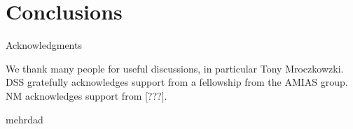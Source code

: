 \documentclass{emulateapj}
\begin{document}


\subsection{}

\section{Conclusions}
\label{sec:conc}

\vspace{0.5in}


{\sc Acknowledgments}

We thank many people for useful discussions, in particular Tony
Mroczkowzki.  DSS gratefully acknowledges support from a fellowship
from the AMIAS group.  NM acknowledges support from [???].

\newpage

mehrdad

\newpage




\clearpage
\end{document}
